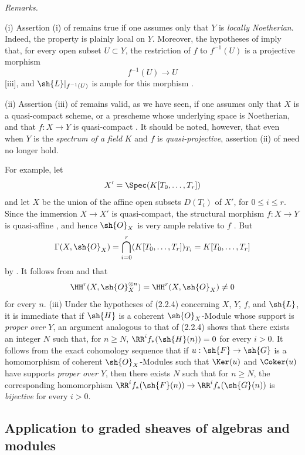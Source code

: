 \begin{env}[2.2.5]
\label{III.2.2.5}
\emph{Remarks.}

(i) Assertion (i) of  remains true if one assumes only that $Y$ is \emph{locally Noetherian}.
Indeed, the property is plainly local on $Y$.
Moreover, the hypotheses of  imply that, for every open subset $U\subset Y$, the restriction of $f$ to $f^{-1}(U)$ is a projective morphism
\[
  f^{-1}(U)\longrightarrow U
\]
[iii], and $\sh{L}|_{f^{-1}(U)}$ is ample for this morphism .

(ii) Assertion (iii) of  remains valid, as we have seen, if one assumes only that $X$ is a quasi-compact scheme, or a prescheme whose underlying space is Noetherian, and that $f:X\to Y$ is quasi-compact .
It should be noted, however, that even when $Y$ is the \emph{spectrum of a field} $K$ and $f$ is \emph{quasi-projective}, assertion (ii) of  need no longer hold.

For example, let
\[
  X'=\Spec(K[T_0,\ldots,T_r])
\]
and let $X$ be the union of the affine open subsets $D(T_i)$ of $X'$, for $0\leq i\leq r$.
Since the immersion $X\to X'$ is quasi-compact, the structural morphism $f:X\to Y$ is quasi-affine , and hence $\sh{O}_X$ is very ample relative to $f$ .
But
\[
  \Gamma(X,\sh{O}_X)
  =\bigcap_{i=0}^r(K[T_0,\ldots,T_r])_{T_i}
  =K[T_0,\ldots,T_r]
\]
by .
It follows from  and  that
\[
  \HH^r(X,\sh{O}_X^{\otimes n})
  =\HH^r(X,\sh{O}_X)
  \neq0
\]
for every $n$.
(iii) Under the hypotheses of (2.2.4) concerning $X$, $Y$, $f$, and $\sh{L}$,
it is immediate that if $\sh{H}$ is a coherent $\sh{O}_X$-Module whose support
is \emph{proper over $Y$}, an argument analogous to that of (2.2.4) shows
that there exists an integer $N$ such that, for $n\geq N$,
$\RR^if_*(\sh{H}(n))=0$ for every $i>0$. It follows from the exact
cohomology sequence that if $u:\sh{F}\to\sh{G}$ is a homomorphism of coherent
$\sh{O}_X$-Modules such that $\Ker(u)$ and $\Coker(u)$ have supports
\emph{proper over $Y$}, then there exists $N$ such that for $n\geq N$, the
corresponding homomorphism
$\RR^if_*(\sh{F}(n))\to\RR^if_*(\sh{G}(n))$ is \emph{bijective} for every
$i>0$.
\end{env}


\subsection{Application to graded sheaves of algebras and modules}
\label{subsection:III.2.3}

